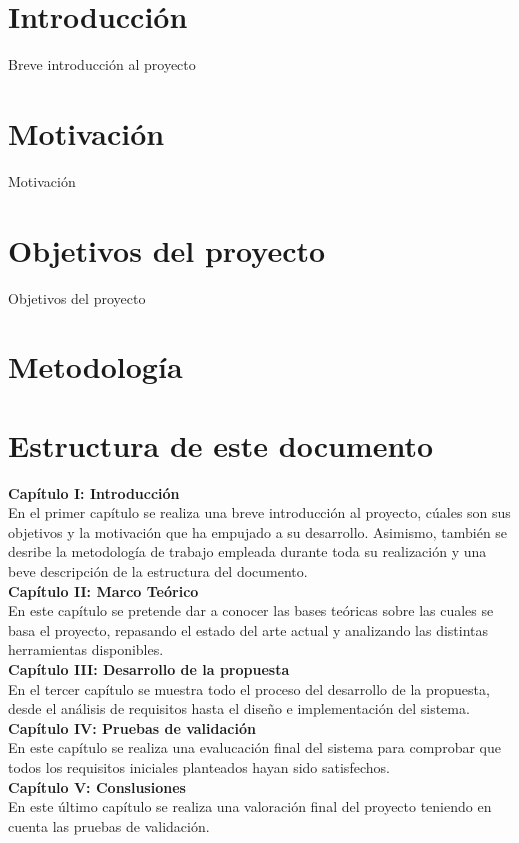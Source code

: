 \section{Introducción}
Breve introducción al proyecto

\section{Motivación}
Motivación

\section{Objetivos del proyecto}
Objetivos del proyecto

\section{Metodología}


\section{Estructura de este documento}
\noindent \textbf{Capítulo I: Introducción}\\
En el primer capítulo se realiza una breve introducción al proyecto, cúales son sus objetivos y la motivación que ha empujado a su desarrollo. Asimismo, también se desribe la metodología de trabajo empleada durante toda su realización y una beve descripción de la estructura del documento.  \\

\noindent \textbf{Capítulo II: Marco Teórico}\\
En este capítulo se pretende dar a conocer las bases teóricas sobre las cuales se basa el proyecto, repasando el estado del arte actual y analizando las distintas herramientas disponibles.\\

\noindent \textbf{Capítulo III: Desarrollo de la propuesta}\\
En el tercer capítulo se muestra todo el proceso del desarrollo de la propuesta, desde el análisis de requisitos hasta el diseño e implementación del sistema. \\

\noindent \textbf{Capítulo IV: Pruebas de validación}\\
En este capítulo se realiza una evalucación final del sistema para comprobar que todos los requisitos iniciales planteados hayan sido satisfechos.\\

\noindent \textbf{Capítulo V: Conslusiones}\\
En este último capítulo se realiza una valoración final del proyecto teniendo en cuenta las pruebas de validación.